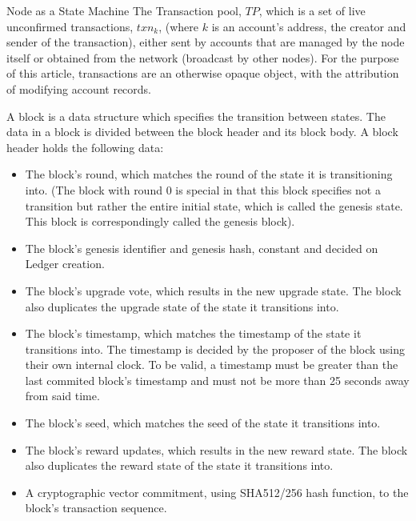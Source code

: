 \documentclass[10pt,a4paper]{article}
\begin{document}
\begin{section}{Node as a State Machine}
The Transaction pool, $TP$, which is a set of live unconfirmed transactions, $txn_k$, (where 
$k$ is an account's address, the creator and sender of the transaction), either
sent by accounts that are managed by the node itself or obtained from the network 
(broadcast by other nodes).
For the purpose of this article, transactions are an otherwise opaque object, with the 
attribution of modifying account records.

A {\sf block} is a data structure which specifies the transition between states.
The data in a block is divided between the block header and its block body.
A block header holds the following data:
\begin{itemize}
    \item
    The block's round, which matches the round of the state it is transitioning
    into. (The block with round 0 is special in that this block specifies not
    a transition but rather the entire initial state, which is called the genesis
    state. This block is correspondingly called the genesis block).
    
    \item
    The block's genesis identifier and genesis hash, constant and decided on
    Ledger creation.
    
    \item
    The block's upgrade vote, which results in the new upgrade state. The
    block also duplicates the upgrade state of the state it transitions into.
    
    \item
    The block's timestamp, which matches the timestamp of the state it transitions into. 
    The timestamp is decided by the proposer of the block using their own internal clock. 
    To be valid, a timestamp must be greater than the last commited block's timestamp 
    and must not be more than 25 seconds away from said time.
    
    \item
    The block's seed, which matches the seed of the state it transitions into.
    
    \item
    The block's reward updates, which results in the new reward state. The
    block also duplicates the reward state of the state it transitions into.
    
    \item
    A cryptographic vector commitment, using SHA512/256 hash function,
     to the block's transaction sequence.
    

\end{itemize}
\end{section}
\end{document}
